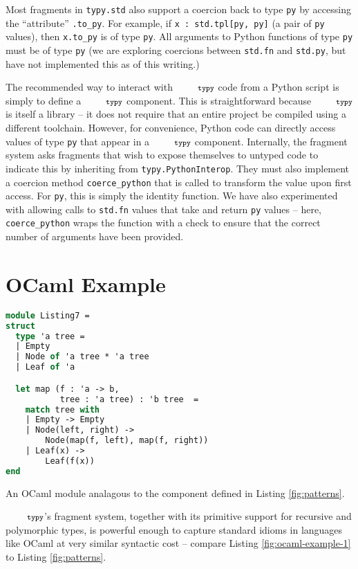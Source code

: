 \documentclass[10pt]{sigplanconf}
\newcommand{\typy}{\texttt{\footnotesize typy}}
\newcommand{\lip}[1]{\lstinline[language=Python,basicstyle=\ttfamily\footnotesize,morekeywords={with},deletendkeywords={tuple,buffer,map}]{#1}}
\newcommand{\li}[1]{\lip{#1}}
\begin{document}
Most fragments in \li{typy.std} also support a coercion back to type \li{py} by accessing the ``attribute'' \li{.to_py}. For example, if \li{x : std.tpl[py, py]} (a pair of \li{py} values), then \li{x.to_py} is of type \li{py}. All arguments to Python functions of type \li{py} must be of type \li{py} (we are exploring coercions between \li{std.fn} and \li{std.py}, but have not implemented this as of this writing.)

The recommended way to interact with $\typy$ code from a Python script is simply to define a $\typy$ component. This is straightforward because $\typy$ is itself a library -- it does not require that an entire project be compiled using a different toolchain. However, for convenience, Python code can directly access values of type \li{py} that appear in a $\typy$ component. Internally, the fragment system asks fragments that wish to expose themselves to untyped code to indicate this by inheriting from \li{typy.PythonInterop}. They must also implement a coercion method \li{coerce_python} that is called to transform the value upon first access. For \li{py}, this is simply the identity function. We have also experimented with allowing calls to \li{std.fn} values that take and return \li{py} values -- here, \li{coerce_python} wraps the function with a check to ensure that the correct number of arguments have been provided. 


\section{OCaml Example}\label{sec:ocaml-examples}
\begin{codelisting}[h!]
\vspace{-3px}
\begin{lstlisting}[language=ML, morekeywords={module,match}]
module Listing7 = 
struct
  type 'a tree = 
  | Empty
  | Node of 'a tree * 'a tree
  | Leaf of 'a

  let map (f : 'a -> b, 
           tree : 'a tree) : 'b tree  =
    match tree with 
    | Empty -> Empty
    | Node(left, right) -> 
        Node(map(f, left), map(f, right))
    | Leaf(x) -> 
        Leaf(f(x))
end
\end{lstlisting}
\caption{An OCaml module analagous to the component defined in Listing \ref{fig:patterns}.}
\label{fig:ocaml-example-1}
\end{codelisting}

$\typy$'s fragment system, together with its primitive support for recursive and polymorphic types, is powerful enough to capture standard idioms in languages like OCaml at very similar syntactic cost -- compare Listing \ref{fig:ocaml-example-1} to Listing \ref{fig:patterns}. 
\end{document}
